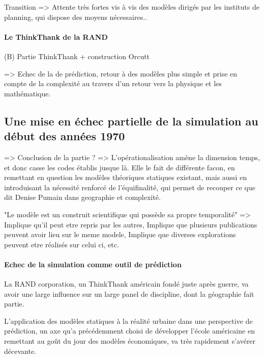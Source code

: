 {%

Transition => Attente très fortes vis à vis des modèles dirigés par les instituts de planning, qui dispose des moyens nécessaires.. 

\paragraph{Le ThinkThank de la RAND}

(B) Partie ThinkThank + construction Orcutt


=> Echec de la de prédiction, retour à des modèles plus simple et prise en compte de la complexité au travers d'un retour vers la physique et les mathématique.

\subsection{Une mise en échec partielle de la simulation au début des années 1970}

=> Conclusion de la partie ? => L'opérationalisation amène la dimension temps, et donc casse les codes établis jusque là. 
Elle le fait de différente facon, en remettant en question les modèles théoriques statiques existant, mais aussi en introduisant la nécessité renforcé de l'équifinalité, qui permet de recouper ce que dit Denise Pumain dans geographie et complexité.

"Le modèle est un construit scientifique qui possède sa propre temporalité" => Implique qu'il peut etre repris par les autres, Implique que plusieurs publications peuvent avoir lieu sur le meme modele, Implique que diverses explorations peuvent etre réalisés sur celui ci, etc.

\paragraph{Echec de la simulation comme outil de prédiction}
La RAND corporation, un ThinkThank américain fondé juste après guerre, va avoir une large influence sur un large panel de discipline, dont la géographie fait partie.

L'application des modèles statiques à la réalité urbaine dans une perspective de prédiction, un axe qu'a précédemment choisi de développer l'école américaine en remettant au goût du jour des modèles économiques, va très rapidement s'avérer décevante.

}
